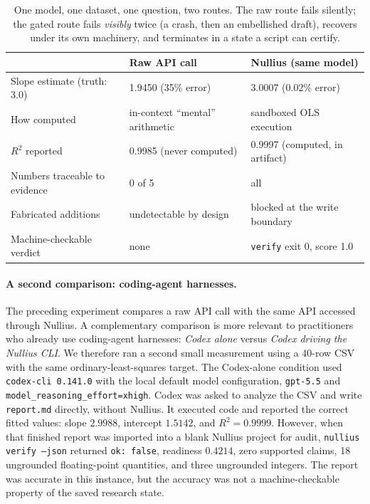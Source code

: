 \documentclass[11pt]{article}
\begin{document}
\begin{table}[h]
\centering
\small
\begin{tabular}{@{}lll@{}}
\toprule
 & \textbf{Raw API call} & \textbf{Nullius (same model)} \\
\midrule
Slope estimate (truth: 3.0) & 1.9450 \; (35\% error) & 3.0007 \; (0.02\% error) \\
How computed & in-context ``mental'' arithmetic & sandboxed OLS execution \\
$R^2$ reported & 0.9985 (never computed) & 0.9997 (computed, in artifact) \\
Numbers traceable to evidence & 0 of 5 & all \\
Fabricated additions & undetectable by design & blocked at the write boundary \\
Machine-checkable verdict & none & \texttt{verify} exit 0, score 1.0 \\
\bottomrule
\end{tabular}
\caption{One model, one dataset, one question, two routes. The raw route fails silently; the gated route fails \emph{visibly} twice (a crash, then an embellished draft), recovers under its own machinery, and terminates in a state a script can certify.}
\label{tab:casestudy}
\end{table}

\paragraph{A second comparison: coding-agent harnesses.}
The preceding experiment compares a raw API call with the same API accessed through Nullius. A complementary comparison is more relevant to practitioners who already use coding-agent harnesses: \emph{Codex alone} versus \emph{Codex driving the Nullius CLI}. We therefore ran a second small measurement using a 40-row CSV with the same ordinary-least-squares target. The Codex-alone condition used \texttt{codex-cli 0.141.0} with the local default model configuration, \texttt{gpt-5.5} and \texttt{model\_reasoning\_effort=xhigh}. Codex was asked to analyze the CSV and write \texttt{report.md} directly, without Nullius. It executed code and reported the correct fitted values: slope $2.9988$, intercept $1.5142$, and $R^2=0.9999$. However, when that finished report was imported into a blank Nullius project for audit, \texttt{nullius verify --json} returned \texttt{ok: false}, readiness $0.4214$, zero supported claims, 18 ungrounded floating-point quantities, and three ungrounded integers. The report was accurate in this instance, but the accuracy was not a machine-checkable property of the saved research state.
\end{document}
